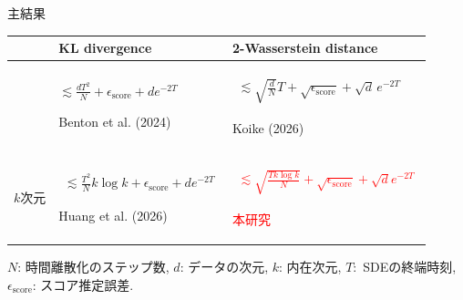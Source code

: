 \documentclass[11pt]{beamer}
\begin{document}
\begin{frame}[t]{主結果}
  \vspace{1.5cm}
  \centering
  \renewcommand{\arraystretch}{1.4}
  \setlength{\tabcolsep}{0.35em}
  \begin{tabular}{
    >{\centering\arraybackslash}m{}|
    >{\centering\arraybackslash}m{}|
    >{\centering\arraybackslash}m{}}
    \hline
    & {\large\textbf{KL divergence}}
    & {\large\textbf{2-Wasserstein distance}} \\
    \hline
    {\large $d$次元}
    & {\small
      $\displaystyle
        \lesssim
          \frac{dT^2}{N}
          +\epsilon_{\mathrm{score}}
          +de^{-2T}
      $
      \par\vspace{0.25em}
      {\footnotesize Benton et al. (2024)}}
    & {\small
      $\displaystyle
      \begin{aligned}
        \lesssim
          \sqrt{\frac{d}{N}}T
          +\sqrt{\epsilon_{\mathrm{score}}}+\sqrt d\,e^{-2T}
      \end{aligned}$
      \par\vspace{0.25em}
      {\footnotesize Koike (2026)}} \\
    \hline
    {\large $k$次元}
    & {\small
      $\displaystyle
      \begin{aligned}
        \lesssim
          \frac{T^2}{N}k\log k
          +\epsilon_{\mathrm{score}}+de^{-2T}
      \end{aligned}$
      \par\vspace{0.25em}
      {\footnotesize Huang et al. (2026)}}
    & {\small
      \textcolor{red}{$\displaystyle
      \begin{aligned}
        \lesssim
        \sqrt{\frac{Tk\log k}{N}}
        +\sqrt{\epsilon_{\mathrm{score}}}+\sqrt{d}e^{-2T}
      \end{aligned}$}
      \par\vspace{0.2em}
      {\footnotesize\textcolor{red}{本研究}}} \\
    \hline
  \end{tabular}

  \vspace{-0.1em}
  \begin{minipage}{0.96\textwidth}
    \footnotesize
    \raggedright
    $N$: 時間離散化のステップ数, \quad
    $d$: データの次元, \quad
    $k$: 内在次元, \quad
    \mbox{$T$: SDEの終端時刻}, \quad\quad
    $\epsilon_{\mathrm{score}}$: スコア推定誤差.
  \end{minipage}
\end{frame}
\end{document}
